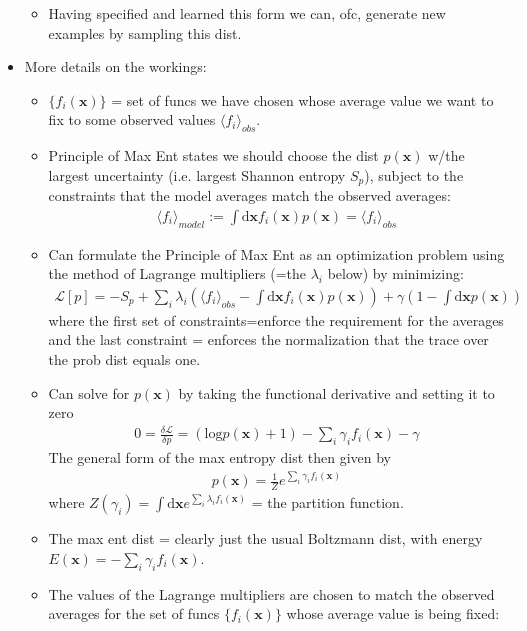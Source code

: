 \documentclass[norsk,a4paper,11pt]{article}
\begin{document}
\begin{itemize}
\begin{itemize}
		\item Having specified and learned this form we can, ofc, generate new examples by sampling this dist.
	\end{itemize}
	\item More details on the workings:
	\begin{itemize} 
		\item $\{ f_i(\bm{x}) \}$ = set of funcs we have chosen whose average value we want to fix to some observed values $\langle f_i \rangle_{obs}$.
		\item Principle of Max Ent states we should choose the dist $p(\bm{x})$ w/the largest uncertainty (i.e. largest Shannon entropy $S_p$), subject to the constraints that the model averages match the observed averages:
		\begin{align}
			\langle f_i \rangle_{model} := \int \text{d} \bm{x} f_i(\bm{x})p(\bm{x}) = \langle f_i \rangle_{obs}
		\end{align}
		\item Can formulate the Principle of Max Ent as an optimization problem using the method of Lagrange multipliers (=the $\lambda_i$ below) by minimizing:
		\begin{align}
			\mathcal{L}[p] = -S_p + \sum_i \lambda_i (\langle f_i \rangle_{obs} - \int \text{d} \bm{x} f_i(\bm{x})p(\bm{x})) + \gamma (1 - \int \text{d} \bm{x} p(\bm{x}))
		\end{align}
		where the first set of constraints=enforce the requirement for the averages and the last constraint = enforces the normalization that the trace over the prob dist equals one.
		\item Can solve for $p(\bm{x})$ by taking the functional derivative and setting it to zero
		\begin{align}
			0 = \frac{\delta \mathcal{L}}{\delta p} = (\text{log} p(\bm{x}) + 1) - \sum_i \gamma_i f_i(\bm{x}) - \gamma
		\end{align}
		The general form of the max entropy dist then given by
		\begin{align}
			p(\bm{x}) = \frac{1}{Z} e^{\sum_i \gamma_i f_i (\bm{x})}
		\end{align}
		where $Z(\gamma_i) = \int \text{d} \bm{x} e^{\sum_i \lambda_i f_i (\bm{x})}$ = the partition function.
		\item The max ent dist = clearly just the usual Boltzmann dist, with energy $E(\bm{x}) = -\sum_i \gamma_i f_i (\bm{x})$.
		\item The values of the Lagrange multipliers are chosen to match the observed averages for the set of funcs $\{ f_i(\bm{x}) \}$ whose average value is being fixed:

\end{itemize}
\end{itemize}
\end{document}
